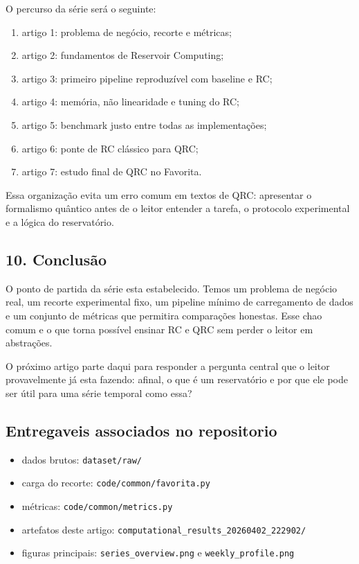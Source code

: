 \documentclass[12pt]{article}
\providecommand{\tightlist}{%
  \setlength{\itemsep}{0pt}\setlength{\parskip}{0pt}}
\begin{document}
O percurso da série será o seguinte:

\begin{enumerate}
\def\labelenumi{\arabic{enumi}.}
\tightlist
\item
  artigo 1: problema de negócio, recorte e métricas;
\item
  artigo 2: fundamentos de Reservoir Computing;
\item
  artigo 3: primeiro pipeline reproduzível com baseline e RC;
\item
  artigo 4: memória, não linearidade e tuning do RC;
\item
  artigo 5: benchmark justo entre todas as implementações;
\item
  artigo 6: ponte de RC clássico para QRC;
\item
  artigo 7: estudo final de QRC no Favorita.
\end{enumerate}

Essa organização evita um erro comum em textos de QRC: apresentar o formalismo quântico antes de o leitor entender a tarefa, o protocolo experimental e a lógica do reservatório.

\subsection{10. Conclusão}\label{10-conclusuxe3o}

O ponto de partida da série esta estabelecido. Temos um problema de negócio real, um recorte experimental fixo, um pipeline mínimo de carregamento de dados e um conjunto de métricas que permitira comparações honestas. Esse chao comum e o que torna possível ensinar RC e QRC sem perder o leitor em abstrações.

O próximo artigo parte daqui para responder a pergunta central que o leitor provavelmente já esta fazendo: afinal, o que é um reservatório e por que ele pode ser útil para uma série temporal como essa?

\subsection{Entregaveis associados no repositorio}\label{entregaveis-associados-no-repositorio}

\begin{itemize}
\tightlist
\item
  dados brutos: \texttt{dataset/raw/}
\item
  carga do recorte: \texttt{code/common/favorita.py}
\item
  métricas: \texttt{code/common/metrics.py}
\item
  artefatos deste artigo: \texttt{computational\_results\_20260402\_222902/}
\item
  figuras principais: \texttt{series\_overview.png} e \texttt{weekly\_profile.png}
\end{itemize}
\end{document}
